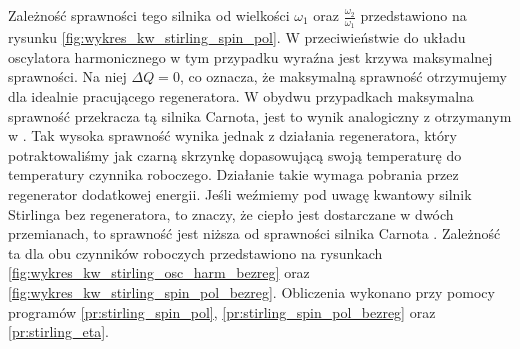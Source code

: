 Zależność sprawności tego silnika od wielkości \(\omega_1\) oraz \(\frac{\omega_2}{\omega_1}\) przedstawiono na rysunku \ref{fig:wykres_kw_stirling_spin_pol}. W przeciwieństwie do układu oscylatora harmonicznego w tym przypadku wyraźna jest krzywa maksymalnej sprawności. Na niej \(\Delta Q = 0\), co oznacza, że maksymalną sprawność otrzymujemy dla idealnie pracującego regeneratora. W obydwu przypadkach maksymalna sprawność przekracza tą silnika Carnota, jest to wynik analogiczny z otrzymanym w \cite{huang_stirling}. Tak wysoka sprawność wynika jednak z działania regeneratora, który potraktowaliśmy jak czarną skrzynkę dopasowującą swoją temperaturę do temperatury czynnika roboczego. Działanie takie wymaga pobrania przez regenerator dodatkowej energii. Jeśli weźmiemy pod uwagę kwantowy silnik Stirlinga bez regeneratora, to znaczy, że ciepło jest dostarczane w dwóch przemianach, to sprawność jest niższa od sprawności silnika Carnota \cite{huang_stirling}. Zależność ta dla obu czynników roboczych przedstawiono na rysunkach \ref{fig:wykres_kw_stirling_osc_harm_bezreg} oraz \ref{fig:wykres_kw_stirling_spin_pol_bezreg}. Obliczenia wykonano przy pomocy programów \ref{pr:stirling_spin_pol}, \ref{pr:stirling_spin_pol_bezreg} oraz \ref{pr:stirling_eta}.
